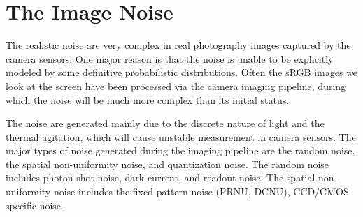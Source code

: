 \section{The Image Noise}
\label{sec:intro:current}

The realistic noise are very complex in real photography images captured by the camera sensors. One major reason is that the noise is unable to be explicitly modeled by some definitive probabilistic distributions. Often the sRGB images we look at the screen have been processed via the camera imaging pipeline, during which the noise will be much more complex than its initial status. 

The noise are generated mainly due to the discrete nature of light and the thermal agitation, which will cause unstable measurement in camera sensors. The major types of noise generated during the imaging pipeline are the random noise, the spatial non-uniformity noise, and quantization noise. The random noise includes photon shot noise, dark current, and readout noise. The spatial non-uniformity noise includes the fixed pattern noise (PRNU, DCNU), CCD/CMOS specific noise. 

